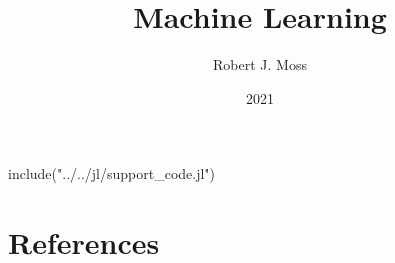 \documentclass[fullbook]{tufte_algorithms_book}
\title{Machine Learning}
\author[Moss]{Robert J. Moss}
\date{2021}
\begin{document}
\begin{jlcode}
	include("../../jl/support_code.jl")
\end{jlcode}

\frontmatter

% 
% 

\tableofcontents\label{cha:toc}


% 
\mainmatter










\navheader{\currentname}

\backmatter

\chapter*{References}
\printbibliography[heading=none]

\printindex
\end{document}
